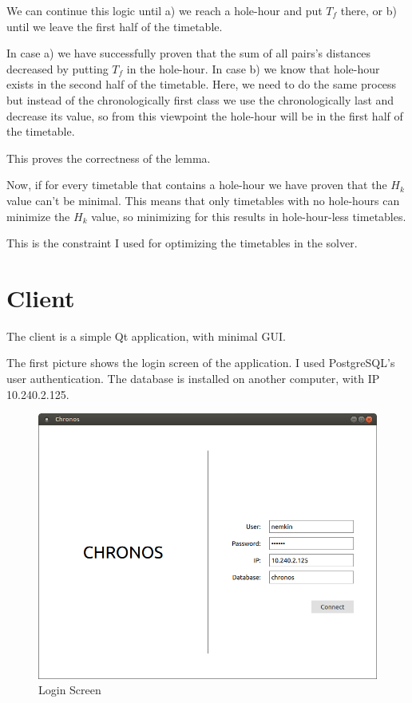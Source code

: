 We can continue this logic until a) we reach a hole-hour and put $T_f$ there, or b) until we leave the first half of the timetable.

In case a) we have successfully proven that the sum of all pairs's distances decreased by putting $T_f$ in the hole-hour. In case b) we know that hole-hour exists in the second half of the timetable. Here, we need to do the same process but instead of the chronologically first class we use the chronologically last and decrease its value, so from this viewpoint the hole-hour will be in the first half of the timetable.

This proves the correctness of the lemma.

Now, if for every timetable that contains a hole-hour we have proven that the $H_k$ value can't be minimal. This means that only timetables with no hole-hours can minimize the $H_k$ value, so minimizing for this results in hole-hour-less timetables.

This is the constraint I used for optimizing the timetables in the solver.

\section{Client}

The client is a simple Qt application, with minimal GUI.

The first picture shows the login screen of the application. I used PostgreSQL's user authentication. The database is installed on another computer, with IP 10.240.2.125.

\begin{figure}[!ht]
\centering
\includegraphics[width=\linewidth, keepaspectratio]{figures/login.png}
\caption{Login Screen} 
\end{figure}


